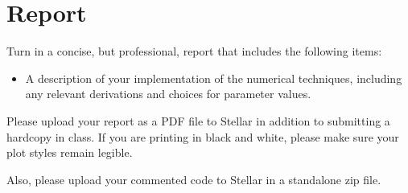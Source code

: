 \documentclass[11pt]{article}
\begin{document}
\section{Report}
Turn in a concise, but professional, report that includes the following items:
\begin{itemize}
\item A description of your implementation of the numerical techniques, including any relevant derivations and choices for parameter values.
\end{itemize}
Please upload your report as a PDF file to Stellar in addition to submitting a hardcopy in class. If you are printing in black and white, please make sure your plot styles remain legible.

Also, please upload your commented code to Stellar in a standalone zip file.
\end{document}

